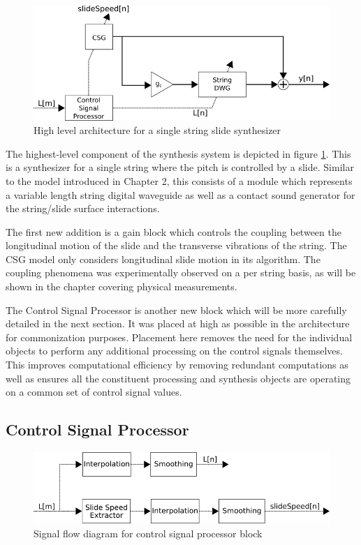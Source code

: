 \documentclass[../main.tex]{subfiles}
\begin{document}
\begin{figure}[h]
    \centering
    \includegraphics[scale=.65]{./images/diagrams/slideSynth.png}
    \caption{High level architecture for a single string slide synthesizer}
    \label{fig:slide_synth}
\end{figure}

The highest-level component of the synthesis system is depicted in figure \ref{fig:slide_synth}. This is a synthesizer for a single string where the pitch is controlled by a slide. Similar to the model introduced in Chapter 2, this consists of a module which represents a variable length string digital waveguide as well as a contact sound generator for the string/slide surface interactions. 

The first new addition is a gain block which controls the coupling between the longitudinal motion of the slide and the transverse vibrations of the string. The CSG model only considers longitudinal slide motion in its algorithm. The coupling phenomena was experimentally observed on a per string basis, as will be shown in the chapter covering physical measurements.

The Control Signal Processor is another new block which will be more carefully detailed in the next section. It was placed at high as possible in the architecture for commonization purposes. Placement here removes the need for the individual objects to perform any additional processing on the control signals themselves. This improves computational efficiency by removing redundant computations as well as ensures all the constituent processing and synthesis objects are operating on a common set of control signal values.

\subsection{Control Signal Processor}

\begin{figure}[h]
    \centering
    \includegraphics[scale=.65]{./images/diagrams/controlSignalProcessor.png}
    \caption{Signal flow diagram for control signal processor block}
    \label{fig:CSP}
\end{figure}
\end{document}
